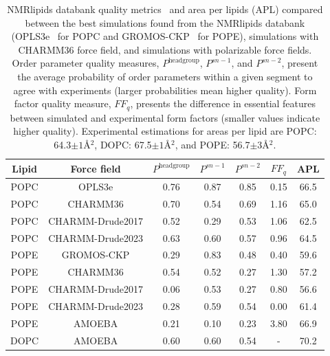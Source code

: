 \documentclass[journal=jctcce,manuscript=article,layout=singlecolumn]{achemso}
\begin{document}
\begin{table}[]
    \centering
    \begin{tabular}{c c c c c c c}
        Lipid & Force field & $P^{\mathrm{headgroup}}$ & $P^{sn-1}$ & $P^{sn-2}$ & $FF_{q}$ & APL \\
        \hline
        POPC & OPLS3e       & 0.76 & 0.87 & 0.85 & 0.15 & 66.5\\
        POPC & CHARMM36     & 0.70 & 0.54 & 0.69 & 1.16 & 65.0\\
        POPC & CHARMM-Drude2017 & 0.52 & 0.29 & 0.53 & 1.06 & 62.5\\
        POPC & CHARMM-Drude2023 & 0.63 & 0.60 & 0.57 & 0.96 & 64.5\\
        \hline
        POPE & GROMOS-CKP & 0.29 & 0.83 & 0.48 & 0.40 & 59.6\\
        POPE & CHARMM36   & 0.54 & 0.52 & 0.27 & 1.30 & 57.2 \\
        POPE & CHARMM-Drude2017 & 0.06 & 0.53 & 0.27 & 0.80 & 56.6  \\
        POPE & CHARMM-Drude2023 & 0.28 & 0.59 & 0.54 & 0.00 & 61.4  \\
        POPE & AMOEBA & 0.21 & 0.10 & 0.23 & 3.80 & 66.9\\
        \hline
        DOPC & AMOEBA & 0.60 & 0.60 & 0.54 & - & 70.2\\
    \end{tabular}
    \caption{NMRlipids databank quality metrics~\cite{Databank} and area per lipids (APL) compared between the best simulations found from the NMRlipids databank (OPLS3e~\cite{roos19} for POPC and GROMOS-CKP~\cite{Chandrasekhar03,kukol09,piggot12} for POPE), simulations with CHARMM36 force field, and simulations with polarizable force fields. Order  parameter quality measures, $P^{\mathrm{headgroup}}$, $P^{sn-1}$, and $P^{sn-2}$, present the average probability of order parameters within a given segment to agree with experiments (larger probabilities mean higher quality). Form factor quality measure, $FF_{q}$, presents the difference in essential features between simulated and experimental form factors (smaller values indicate higher quality). Experimental estimations for areas per lipid are POPC: 64.3$\pm1$\AA$^{2}$\cite{kucerka2011}, DOPC: 67.5$\pm1$\AA$^{2}$\cite{kucerka2008}, and POPE: 56.7$\pm$3\AA$^{2}$\cite{Rickeard2020}.}
    \label{tab:my_label}
\end{table}
\end{document}
